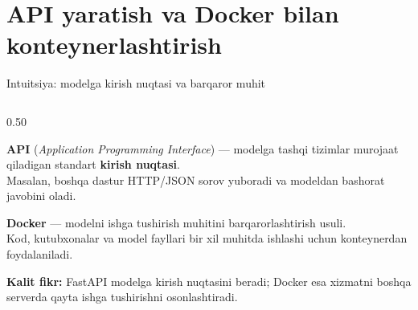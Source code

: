 \documentclass[aspectratio=169,11pt]{beamer}
\newcommand{\uzq}{\textquotesingle{}}   %
\begin{document}
\section[API va Docker]{API yaratish va Docker bilan konteynerlashtirish}

\begin{frame}{Intuitsiya: modelga kirish nuqtasi va barqaror muhit}
  \small
\vspace{-4mm}
  \begin{columns}[T,totalwidth=\textwidth]
    \begin{column}{0.50\textwidth}
      \begin{tcolorbox}[defbox,top=2pt,bottom=2pt,left=4pt,right=4pt]
        \footnotesize
        \textbf{API} (\textit{Application Programming Interface}) ---
        modelga tashqi tizimlar murojaat qiladigan standart
        \textbf{kirish nuqtasi}.\\[2pt]

        Masalan, boshqa dastur HTTP/JSON so\uzq{}rov yuboradi va modeldan
        bashorat javobini oladi.
      \end{tcolorbox}

      \vspace{-2pt}

      \begin{tcolorbox}[defbox,top=2pt,bottom=2pt,left=4pt,right=4pt]
        \footnotesize
        \textbf{Docker} --- modelni ishga tushirish muhitini
        barqarorlashtirish usuli.\\[2pt]

        Kod, kutubxonalar va model fayllari bir xil muhitda ishlashi uchun
        konteynerdan foydalaniladi.
      \end{tcolorbox}

      \vspace{-2pt}

      \begin{tcolorbox}[okbox,top=2pt,bottom=2pt,left=4pt,right=4pt]
        \scriptsize
        \textbf{Kalit fikr:}
        FastAPI modelga kirish nuqtasini beradi; Docker esa xizmatni
        boshqa serverda qayta ishga tushirishni osonlashtiradi.
      \end{tcolorbox}
    \end{column}


\end{columns}
\end{frame}
\end{document}
